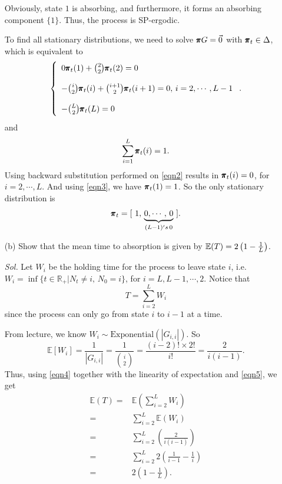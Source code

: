 \begin{enumerate}
    Obviously, state $1$ is absorbing, and furthermore, it forms an absorbing component $\{1\}$. Thus, the process is SP-ergodic.

    To find all stationary distributions, we need to solve $\pmb{\pi} G = \vec{0}$ with $\pmb{\pi}_t \in \Delta$, which is equivalent to 
    \begin{equation}\label{eqn2}
        \left\{ 
        \begin{array}{l}
            0 \pmb{\pi}_t(1) + \binom{2}{2} \pmb{\pi}_t(2) = 0\\ 
             \\ 
            - \binom{i}{2} \pmb{\pi}_t(i) + \binom{i+1}{2} \pmb{\pi}_t(i+1) = 0, \, i = 2, \cdots, L-1 \\ 
             \\ 
            - \binom{L}{2} \pmb{\pi}_t(L) = 0
        \end{array}
        \right. 
        .
    \end{equation}
    and 
    \begin{equation}\label{eqn3}
        \sum_{i=1}^L \pmb{\pi}_t(i) = 1.
    \end{equation}
    Using backward substitution performed on \eqref{eqn2} results in $\pmb{\pi}_t(i) = 0$, for $i = 2,\cdots, L$. And using \eqref{eqn3}, we have $\pmb{\pi}_t(1) = 1$. So the only stationary distribution is 
    \begin{equation*}
        \pmb{\pi}_t = [\ 1, \, \underbrace{0, \cdots,\, 0}_{(L-1)'s \,0}\ ].
    \end{equation*}
    \item[(b)] Show that the mean time to absorption is given by $\mathbb{E}(T) = 2 \left( 1 - \frac{1}{L} \right)$. 
 
    \textit{ Sol. } Let $W_i$ be the holding time for the process to leave state $i$, i.e. $W_i = \inf \{t \in \mathbb{R}_+ | N_t \neq i,\, N_0 = i \}$, for $i = L, L-1, \cdots, 2$. Notice that
    \begin{equation}\label{eqn4}
        T = \sum_{i=2}^L W_i
    \end{equation}
    since the process can only go from state $i$ to $i-1$ at a time.
    
    From lecture, we know $W_i \sim \text{Exponential}(|G_{i,i}|)$. So 
    \begin{equation}\label{eqn5}
        \mathbb{E}[W_i] = \frac{1}{|G_{i,i}|} = \frac{1}{\binom{i}{2}} = \frac{(i-2)! \times 2!}{i!} = \frac{2}{i(i-1)}.
    \end{equation}
    Thus, using \eqref{eqn4} together with the linearity of expectation and \eqref{eqn5}, we get 
    \begin{align*}
        \mathbb{E}(T) = & \mathbb{E} \left(\sum_{i = 2}^L W_i \right) \\ 
        = & \sum_{i = 2}^L  \mathbb{E}(W_i) \\ 
        = & \sum_{i = 2}^L \left( \frac{2}{i(i-1)} \right) \\ 
        = & \sum_{i = 2}^L 2 \left( \frac{1}{i-1} - \frac{1}{i} \right) \\ 
        = & 2 \left(1 - \frac{1}{L} \right).
    \end{align*}


\end{enumerate}
